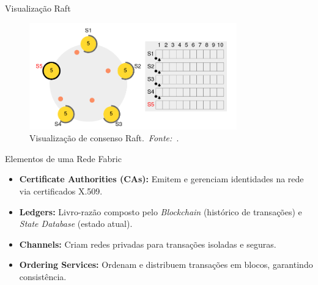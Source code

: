 \begin{frame}{Visualização Raft}

	\begin{figure}
		\centering
		\includegraphics[width=0.8\textwidth]{figures/raftvisualization.png}
		\caption{Visualização de consenso Raft.\ \textit{Fonte:~\cite{raftscope}}.}
		\label{fig:raftvisualization}
	\end{figure}

\end{frame}

\begin{frame}{Elementos de uma Rede Fabric}

	\begin{itemize}
		\item \textbf{Certificate Authorities (CAs):} Emitem e gerenciam identidades
		      na rede via certificados X.509.
		\item \textbf{Ledgers:} Livro-razão composto pelo \textit{Blockchain}
		      (histórico de transações) e \textit{State Database} (estado atual).
		\item \textbf{Channels:} Criam redes privadas para transações isoladas e
		      seguras.
		\item \textbf{Ordering Services:} Ordenam e distribuem transações em blocos,
		      garantindo consistência.
	\end{itemize}

\end{frame}

